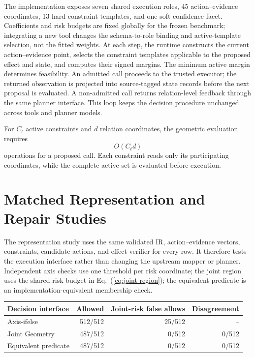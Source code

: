 \documentclass[letterpaper]{article}
\begin{document}
The implementation exposes seven shared execution roles, 45 action--evidence coordinates, 13 hard constraint templates, and one soft confidence facet. Coefficients and risk budgets are fixed globally for the frozen benchmark; integrating a new tool changes the schema-to-role binding and active-template selection, not the fitted weights. At each step, the runtime constructs the current action--evidence point, selects the constraint templates applicable to the proposed effect and state, and computes their signed margins. The minimum active margin determines feasibility. An admitted call proceeds to the trusted executor; the returned observation is projected into source-tagged state records before the next proposal is evaluated. A non-admitted call returns relation-level feedback through the same planner interface. This loop keeps the decision procedure unchanged across tools and planner models.

For $C_t$ active constraints and $d$ relation coordinates, the geometric evaluation requires
\begin{equation}
O(C_t d)
\end{equation}
operations for a proposed call. Each constraint reads only its participating coordinates, while the complete active set is evaluated before execution.

\section{Matched Representation and Repair Studies}
\label{sec:matched-geometry}

The representation study uses the same validated IR, action--evidence vectors, constraints, candidate actions, and effect verifier for every row. It therefore tests the execution interface rather than changing the upstream mapper or planner. Independent axis checks use one threshold per risk coordinate; the joint region uses the shared risk budget in Eq.~(\ref{eq:joint-region}); the equivalent predicate is an implementation-equivalent membership check.

\begin{center}
\small
\begin{tabular}{lrrr}
\toprule
Decision interface & Allowed & Joint-risk false allows & Disagreement\\
\midrule
Axis-ifelse & 512/512 & 25/512 & --\\
Joint Geometry & 487/512 & 0/512 & 0/512\\
Equivalent predicate & 487/512 & 0/512 & 0/512\\
\bottomrule
\end{tabular}
\label{tab:joint-risk}
\end{center}
\end{document}
